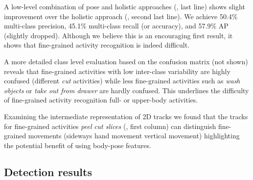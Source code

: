A low-level combination of pose and holistic approaches (, last line)  shows slight improvement over the holistic approach (, second last line). %
We achieve 50.4\% multi-class  precision, 45.1\% multi-class recall (or accuracy), and 57.9\% AP (slightly dropped). Although we believe this is an encouraging first result, it shows that fine-grained activity recognition is indeed difficult.

A more detailed class level evaluation based on the confusion matrix (not shown) reveals that fine-grained activities with low inter-class variability are highly confused (\eg different \emph{cut} activities) 
while less fine-grained activities such as \emph{wash objects} 
or \emph{take out from drawer} are hardly confused. 
This underlines the difficulty of fine-grained activity recognition \vs full- or upper-body activities. 

Examining the intermediate representation of 2D tracks we found that the tracks for fine-grained activities \emph{peel} \vs \emph{cut slices} (, first column) can distinguish fine-grained movements (sideways hand movement \vs vertical movement) highlighting the potential benefit of using body-pose features.


\subsection{Detection results}
\label{sec:cvpr12:results:det}

